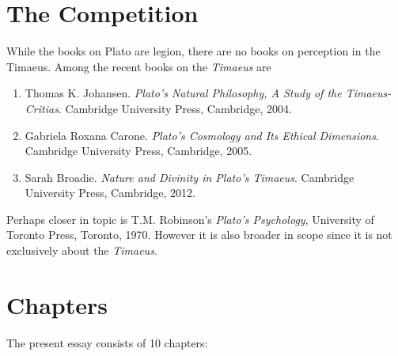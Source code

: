 \documentclass[12pt]{article}
\begin{document}

\section{The Competition} %
\label{sec:the_competition}

While the books on Plato are legion, there are no books on perception in the Timaeus. Among the recent books on the \emph{Timaeus} are

\begin{enumerate}
	\item Thomas K. Johansen. \emph{Plato’s Natural Philosophy, A Study of the Timaeus-Critias}. Cambridge University Press, Cambridge, 2004.
	\item Gabriela Roxana Carone. \emph{Plato’s Cosmology and Its Ethical Dimensions}. Cambridge University Press, Cambridge, 2005.
	\item Sarah Broadie. \emph{Nature and Divinity in Plato’s Timaeus}. Cambridge University Press, Cambridge, 2012.
\end{enumerate}

Perhaps closer in topic is T.M. Robinson's \emph{Plato’s Psychology}, University of Toronto Press, Toronto, 1970. However it is also broader in scope since it is not exclusively about the \emph{Timaeus}.


\section{Chapters} %
\label{sec:chapters}

The present essay consists of 10 chapters:
\end{document}
